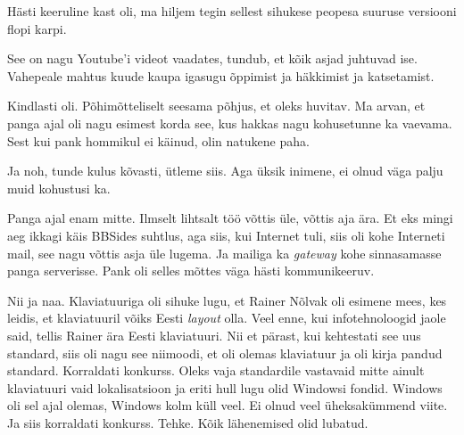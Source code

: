 Hästi keeruline kast oli, ma hiljem tegin  sellest sihukese peopesa suuruse 
versiooni flopi karpi.


See on nagu Youtube'i videot vaadates, tundub, et  kõik asjad juhtuvad ise. 
Vahepeale mahtus kuude kaupa igasugu õppimist ja häkkimist ja katsetamist.


Kindlasti oli. Põhimõtteliselt seesama põhjus, et oleks huvitav. Ma arvan, et 
panga ajal oli nagu esimest korda  see, kus hakkas nagu kohusetunne ka vaevama. 
Sest kui pank  hommikul ei käinud, olin natukene paha.

Ja noh, tunde kulus kõvasti, ütleme siis. Aga üksik inimene,  ei olnud  väga 
palju muid kohustusi ka.


Panga ajal enam mitte. Ilmselt lihtsalt töö võttis üle,  võttis aja ära. Et eks 
mingi aeg ikkagi käis BBSides suhtlus, aga siis, kui Internet tuli, siis oli 
kohe Interneti mail, see nagu võttis asja üle lugema. Ja mailiga ka 
\emph{gateway} kohe sinnasamasse panga serverisse. Pank oli selles mõttes väga 
hästi kommunikeeruv.


Nii ja naa. Klaviatuuriga oli sihuke lugu, et Rainer Nõlvak oli esimene mees, kes leidis, et klaviatuuril võiks Eesti \emph{layout} 
olla. Veel enne, kui infotehnoloogid jaole said, tellis Rainer ära Eesti 
klaviatuuri. Nii et pärast, kui kehtestati see uus standard, siis oli nagu see 
niimoodi, et oli olemas klaviatuur ja oli kirja pandud standard. Korraldati 
konkurss. Oleks vaja standardile vastavaid mitte ainult klaviatuuri vaid 
lokalisatsioon ja eriti hull lugu olid Windowsi fondid. 
Windows oli sel ajal olemas, Windows kolm küll veel. Ei olnud 
veel üheksakümmend viite. Ja siis korraldati konkurss. Tehke. Kõik lähenemised 
olid lubatud.


